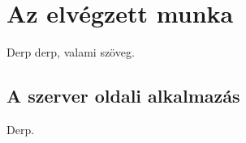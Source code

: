 \chapter{Az elvégzett munka}
Derp derp, valami szöveg\cite{Wettl04}. 



\section{A szerver oldali alkalmazás}
Derp.



